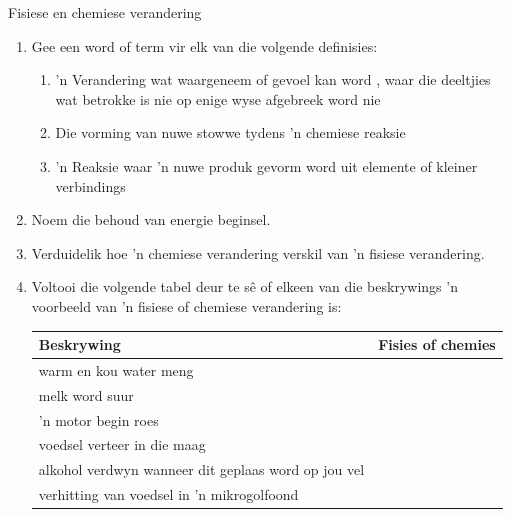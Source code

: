 \label{m38711*secfhsst!!!underscore!!!id584}
            \begin{eocexercises}{Fisiese en chemiese verandering}
            \nopagebreak
      \label{m38711*id65631}\begin{enumerate}[noitemsep, label=\textbf{\arabic*}. ] 
            \label{m38711*uid6234}\item Gee een word of term vir elk van die volgende definisies:
\label{m38711*id632243}\begin{enumerate}[noitemsep, label=\textbf{\alph*}. ] 
            \item 'n Verandering wat waargeneem of gevoel kan word , waar die deeltjies wat betrokke is nie op enige wyse afgebreek word nie
\item Die vorming van nuwe stowwe tydens 'n chemiese reaksie
\item 'n Reaksie waar 'n nuwe produk gevorm word uit elemente of kleiner verbindings \end{enumerate}
\label{m38711*id63272}\item Noem die behoud van energie beginsel.\newline
\label{m38711*id6244}\item Verduidelik hoe 'n chemiese verandering verskil van 'n fisiese verandering.\newline
\label{m38711*uid52}\item Voltooi die volgende tabel deur te sê of elkeen van die beskrywings 'n voorbeeld van 'n fisiese of chemiese verandering is:
          \begin{table}[H]
        \begin{center}
      \label{m38711*id65648}
    \noindent
      \begin{tabular}{|l|l|}\hline
        \textbf{Beskrywing} &
        \textbf{Fisies of chemies} \\ \hline
        warm en kou water meng &
     \\ \hline
        melk word suur &
     \\ \hline
        'n motor begin roes &
       \\ \hline
        voedsel verteer in die maag &
       \\ \hline
        alkohol verdwyn wanneer dit geplaas word op jou vel &
       \\ \hline
       verhitting van voedsel in 'n mikrogolfoond &

\end{tabular}
\end{center}
\end{table}
\end{enumerate}
\end{eocexercises}
